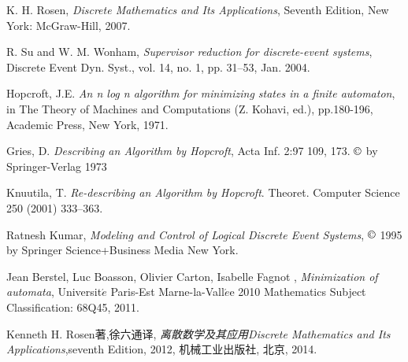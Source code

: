 \begin{thebibliography}{99}
	K. H. Rosen, \textit{Discrete Mathematics and Its Applications}, Seventh Edition, New York: McGraw-Hill, 2007.
	
	R. Su and W. M. Wonham, \textit{Supervisor reduction for discrete-event systems}, Discrete Event Dyn. Syst., vol. 14, no. 1, pp. 31–53, Jan. 2004.
	
	Hopcroft, J.E. \textit{An n log n algorithm for minimizing states in a finite automaton}, in The Theory of Machines and Computations (Z. Kohavi, ed.), pp.180-196, Academic Press, New York, 1971.
	
	Gries, D. \textit{Describing an Algorithm by Hopcroft}, Acta Inf. 2:97 109, 173. $\copyright$ by Springer-Verlag 1973
	
	Knuutila, T. \textit{Re-describing an Algorithm by Hopcroft}. Theoret. Computer Science 250 (2001) 333--363.
	
	Ratnesh Kumar, \textit{Modeling and Control of Logical Discrete Event Systems}, $\copyright$ 1995 by Springer Science+Business Media New York.
	
	Jean Berstel, Luc Boasson, Olivier Carton, Isabelle Fagnot
	, \textit{Minimization of automata}, Universit$\acute{e}$ Paris-Est Marne-la-Vall$\acute{e}$e 2010 Mathematics Subject Classification: 68Q45, 2011.
	
	Kenneth H. Rosen著,徐六通译, \textit{离散数学及其应用Discrete Mathematics and Its Applications},seventh Edition, 2012, 机械工业出版社, 北京, 2014.
	
\end{thebibliography}
